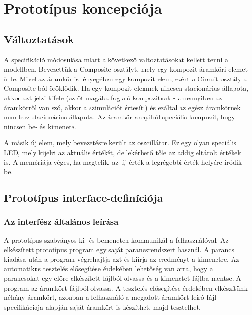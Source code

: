 %
\chapter{Prototípus koncepciója}

\parindent 0pt
\setcounter{secnumdepth}{3}
\setcounter{tocdepth}{3}
\thispagestyle{fancy}

\setcounter{section}{-1}
\section{Változtatások}

A specifikáció módosulása miatt a következő változtatásokat kellett tenni a modellben.
Bevezettük a Composite osztályt, mely egy kompozit áramköri elemet ír le. Mivel az áramkör is lényegében egy kompozit elem, ezért a Circuit osztály a Composite-ból öröklődik. Ha egy kompozit elemnek nincsen stacionárius állapota, akkor azt jelzi kifele (az őt magába foglaló kompozitnak - amennyiben az áramkörről van szó, akkor a szimulációt értesíti) és ezáltal az egész áramkörnek nem lesz stacionárius állapota. Az áramkör annyiból speciális kompozit, hogy nincsen be- és kimenete.

A másik új elem, mely bevezetésre került az oszcillátor. Ez egy olyan speciális LED, mely kijelzi az aktuális értékét, de lekérhető tőle az addig eltárolt értékek is. A memóriája véges, ha megtelik, az új érték a legrégebbi érték helyére íródik be.

\section{Prototípus interface-definíciója}

\subsection{Az interfész általános leírása}
A prototípus szabványos ki- és bemeneten kommunikál a felhasználóval. Az elkészített prototípus program egy
saját parancsrendszert használ. A parancs kiadása után a program végrehajtja azt és kiírja az eredményt a kimenetre. Az automatikus tesztelés elősegítése érdekében lehetőség van arra, hogy 
a parancsokat egy előre elkészített fájlból olvassa és a kimenetet fájlba mentse. A program az áramkört
fájlból olvassa. A tesztelés elősegítése érdekében elkészítünk néhány áramkört, azonban a felhasználó a megadott áramkört leíró fájl specifikációja alapján saját áramkört is készíthet, majd tesztelhet.

